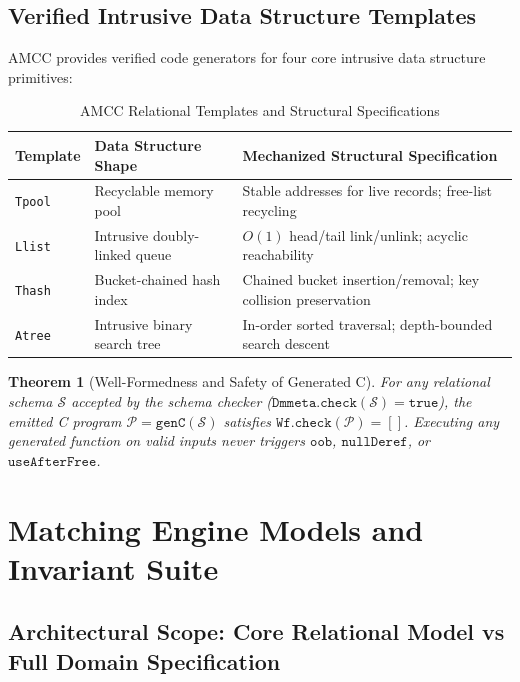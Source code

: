 \documentclass[11pt,a4paper]{article}
\newtheorem{theorem}{Theorem}
\begin{document}
\subsection{Verified Intrusive Data Structure Templates}

AMCC provides verified code generators for four core intrusive data structure primitives:

\begin{table}[h]
\centering
\small
\caption{AMCC Relational Templates and Structural Specifications}
\label{tab:templates}
\begin{tabular}{lll}
\toprule
\textbf{Template} & \textbf{Data Structure Shape} & \textbf{Mechanized Structural Specification} \\
\midrule
\texttt{Tpool} & Recyclable memory pool & Stable addresses for live records; free-list recycling \\
\texttt{Llist} & Intrusive doubly-linked queue & $O(1)$ head/tail link/unlink; acyclic reachability \\
\texttt{Thash} & Bucket-chained hash index & Chained bucket insertion/removal; key collision preservation \\
\texttt{Atree} & Intrusive binary search tree & In-order sorted traversal; depth-bounded search descent \\
\bottomrule
\end{tabular}
\end{table}

\begin{theorem}[Well-Formedness and Safety of Generated C]
For any relational schema $\mathcal{S}$ accepted by the schema checker ($\mathtt{Dmmeta.check}(\mathcal{S}) = \mathtt{true}$), the emitted C program $\mathcal{P} = \mathtt{genC}(\mathcal{S})$ satisfies $\mathtt{Wf.check}(\mathcal{P}) = []$. Executing any generated function on valid inputs never triggers $\mathtt{oob}$, $\mathtt{nullDeref}$, or $\mathtt{useAfterFree}$.
\end{theorem}

\section{Matching Engine Models and Invariant Suite}
\label{sec:engine}

\subsection{Architectural Scope: Core Relational Model vs Full Domain Specification}
\end{document}
